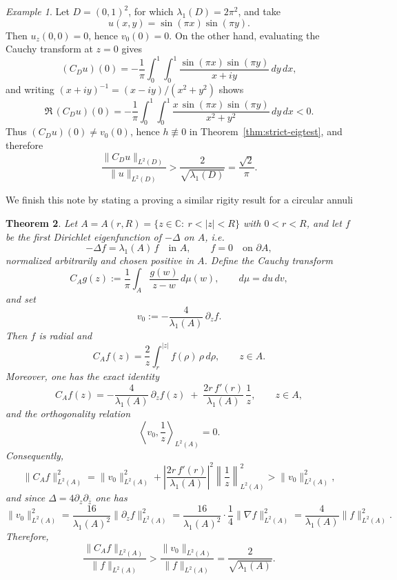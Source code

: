 \documentclass{amsart}
\newcommand{\C}{\mathbb{C}}
\theoremstyle{plain}
\newtheorem{theorem}{Theorem}
\theoremstyle{remark}
\newtheorem{example}[theorem]{Example}
\begin{document}
\begin{example}\label{ex:square}
Let $D=(0,1)^2$, for which $\lambda_1(D)=2\pi^2$, and take
\[
u(x,y)=\sin(\pi x)\sin(\pi y).
\]
Then $u_z(0,0)=0$, hence $v_0(0)=0$. On the other hand, evaluating the Cauchy transform at $z=0$ gives
\[
(C_Du)(0)=-\frac1\pi\int_0^1\int_0^1\frac{\sin(\pi x)\sin(\pi y)}{x+iy}\,dy\,dx,
\]
and writing $(x+iy)^{-1}=(x-iy)/(x^2+y^2)$ shows
\[
\Re\,(C_Du)(0)
=-\frac1\pi\int_0^1\int_0^1\frac{x\,\sin(\pi x)\sin(\pi y)}{x^2+y^2}\,dy\,dx<0.
\]
Thus $(C_Du)(0)\neq v_0(0)$, hence $h\not\equiv 0$ in Theorem~\ref{thm:strict-eigtest}, and therefore
\[
\frac{\|C_Du\|_{L^2(D)}}{\|u\|_{L^2(D)}}>\frac{2}{\sqrt{\lambda_1(D)}}=\frac{\sqrt2}{\pi}.
\]
\end{example}
We finish this note by stating a proving a similar rigity result for a circular annuli
\begin{theorem}
Let $A=A(r,R)=\{z\in\C:\ r<|z|<R\}$ with $0<r<R$, and let $f$ be the first Dirichlet eigenfunction of
$-\Delta$ on $A$, i.e.
\[
-\Delta f=\lambda_1(A)\,f\quad \text{in }A,\qquad f=0\quad \text{on }\partial A,
\]
normalized arbitrarily and chosen positive in $A$. Define the  Cauchy transform
\[
C_A g(z):=\frac1\pi\int_A \frac{g(w)}{z-w}\,d\mu(w),\qquad d\mu=du\,dv,
\]
and set
\[
v_0:=-\frac{4}{\lambda_1(A)}\,\partial_z f.
\]
Then $f$ is radial and
\[
C_A f(z)=\frac{2}{z}\int_{r}^{|z|} f(\rho)\,\rho\,d\rho,\qquad z\in A.
\]
Moreover, one has the exact identity
\[
C_A f(z)= -\frac{4}{\lambda_1(A)}\,\partial_z f(z)\;+\;\frac{2r\,f'(r)}{\lambda_1(A)}\,\frac{1}{z},
\qquad z\in A,
\]
and the orthogonality relation
\[
\left\langle v_0,\frac1z\right\rangle_{L^2(A)}=0.
\]
Consequently,
\[
\|C_A f\|_{L^2(A)}^2=\|v_0\|_{L^2(A)}^2
+\left|\frac{2r\,f'(r)}{\lambda_1(A)}\right|^2\left\|\frac1z\right\|_{L^2(A)}^2
>\|v_0\|_{L^2(A)}^2,
\]
and since $\Delta=4\partial_z\partial_{\bar z}$ one has
\[
\|v_0\|_{L^2(A)}^2
=\frac{16}{\lambda_1(A)^2}\|\partial_z f\|_{L^2(A)}^2
=\frac{16}{\lambda_1(A)^2}\cdot\frac14\|\nabla f\|_{L^2(A)}^2
=\frac{4}{\lambda_1(A)}\|f\|_{L^2(A)}^2.
\]
Therefore,
\[
\frac{\|C_A f\|_{L^2(A)}}{\|f\|_{L^2(A)}}
>\frac{\|v_0\|_{L^2(A)}}{\|f\|_{L^2(A)}}
=\frac{2}{\sqrt{\lambda_1(A)}}.
\]
\end{theorem}
\end{document}
